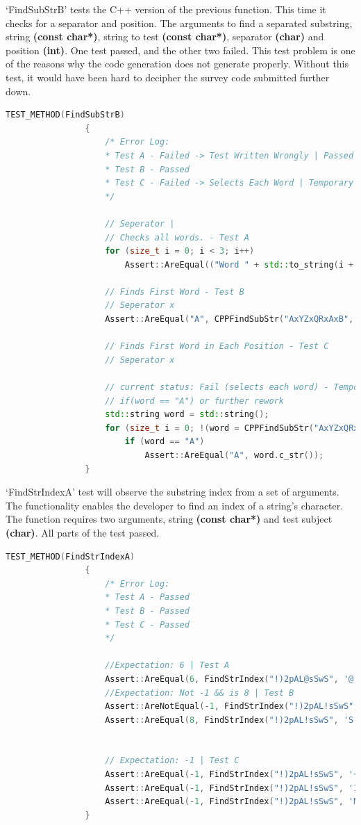 \documentclass[12pt]{report} %
\begin{document}
			`FindSubStrB' tests the C++ version of the previous function. This time it checks for a separator and position. The arguments to find a separated substring, string \textbf{(const char*)}, string to test \textbf{(const char*)}, separator \textbf{(char)} and position \textbf{(int)}. One test passed, and the other two failed. This test problem is one of the reasons why the code generation does not generate properly. Without this test, it would have been hard to decipher the survey code submitted further down.

			\begin{lstlisting}[language=c++]
				TEST_METHOD(FindSubStrB)
				{
					/* Error Log:
					* Test A - Failed -> Test Written Wrongly | Passed
					* Test B - Passed
					* Test C - Failed -> Selects Each Word | Temporary Solution: Read Below.
					*/

					// Seperator |
					// Checks all words. - Test A
					for (size_t i = 0; i < 3; i++)
						Assert::AreEqual(("Word " + std::to_string(i + 1)).c_str(), CPPFindSubStr("Word 1|Word 2|Word 3", "Word", '|', i).c_str());

					// Finds First Word - Test B
					// Seperator x
					Assert::AreEqual("A", CPPFindSubStr("AxYZxQRxAxB", "A", 'x', 0).c_str());

					// Finds First Word in Each Position - Test C
					// Seperator x

					// current status: Fail (selects each word) - Temporary solution:
					// if(word == "A") or further rework
					std::string word = std::string();
					for (size_t i = 0; !(word = CPPFindSubStr("AxYZxQRxAxB", "A", 'x', (int)i)).empty(); i++)
						if (word == "A")
							Assert::AreEqual("A", word.c_str());
				}
			\end{lstlisting}

			`FindStrIndexA' test will observe the substring index from a set of arguments. The functionality enables the developer to find an index of a string's character. The function requires two arguments, string \textbf{(const char*)} and test subject \textbf{(char)}. All parts of the test passed.
			\begin{lstlisting}[language=c++]
				TEST_METHOD(FindStrIndexA)
				{
					/* Error Log:
					* Test A - Passed
					* Test B - Passed
					* Test C - Passed
					*/

					//Expectation: 6 | Test A
					Assert::AreEqual(6, FindStrIndex("!)2pAL@sSwS", '@'));
					//Expectation: Not -1 && is 8 | Test B
					Assert::AreNotEqual(-1, FindStrIndex("!)2pAL!sSwS", 'S'));
					Assert::AreEqual(8, FindStrIndex("!)2pAL!sSwS", 'S'));


					// Expectation: -1 | Test C
					Assert::AreEqual(-1, FindStrIndex("!)2pAL!sSwS", '~'));
					Assert::AreEqual(-1, FindStrIndex("!)2pAL!sSwS", '1'));
					Assert::AreEqual(-1, FindStrIndex("!)2pAL!sSwS", 'M'));
				}
			\end{lstlisting}
\end{document}
